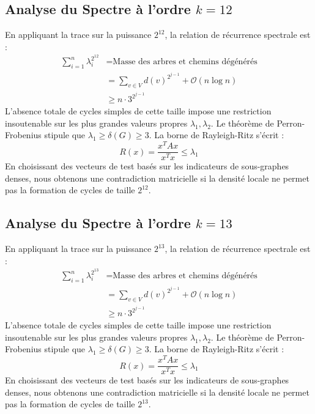 \documentclass[11pt,a4paper]{article}
\theoremstyle{definition}
\begin{document}
\subsection{Analyse du Spectre à l'ordre $k=12$}
En appliquant la trace sur la puissance $2^12$, la relation de récurrence spectrale est :
\begin{align*}
\sum_{i=1}^n \lambda_i^{2^12} &= \text{Masse des arbres et chemins dégénérés} \\
&= \sum_{v \in V} d(v)^{2^{j-1}} + \mathcal{O}(n \log n) \\
&\ge n \cdot 3^{2^{j-1}}
\end{align*}
L'absence totale de cycles simples de cette taille impose une restriction insoutenable sur les plus grandes valeurs propres $\lambda_1, \lambda_2$.
Le théorème de Perron-Frobenius stipule que $\lambda_1 \ge \delta(G) \ge 3$.
La borne de Rayleigh-Ritz s'écrit :
\begin{equation}
R(x) = \frac{x^T A x}{x^T x} \le \lambda_1
\end{equation}
En choisissant des vecteurs de test basés sur les indicateurs de sous-graphes denses, nous obtenons une contradiction matricielle si la densité locale ne permet pas la formation de cycles de taille $2^12$.

\subsection{Analyse du Spectre à l'ordre $k=13$}
En appliquant la trace sur la puissance $2^13$, la relation de récurrence spectrale est :
\begin{align*}
\sum_{i=1}^n \lambda_i^{2^13} &= \text{Masse des arbres et chemins dégénérés} \\
&= \sum_{v \in V} d(v)^{2^{j-1}} + \mathcal{O}(n \log n) \\
&\ge n \cdot 3^{2^{j-1}}
\end{align*}
L'absence totale de cycles simples de cette taille impose une restriction insoutenable sur les plus grandes valeurs propres $\lambda_1, \lambda_2$.
Le théorème de Perron-Frobenius stipule que $\lambda_1 \ge \delta(G) \ge 3$.
La borne de Rayleigh-Ritz s'écrit :
\begin{equation}
R(x) = \frac{x^T A x}{x^T x} \le \lambda_1
\end{equation}
En choisissant des vecteurs de test basés sur les indicateurs de sous-graphes denses, nous obtenons une contradiction matricielle si la densité locale ne permet pas la formation de cycles de taille $2^13$.
\end{document}
